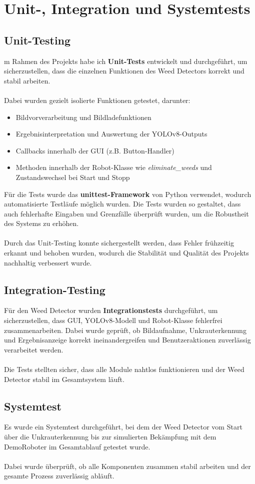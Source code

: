 \documentclass[12pt, a4paper]{scrreprt}
\begin{document}
\chapter{Unit-, Integration und Systemtests}
\section{Unit-Testing}
m Rahmen des Projekts habe ich \textbf{Unit-Tests} entwickelt und durchgeführt, um sicherzustellen, dass die einzelnen Funktionen des Weed Detectors korrekt und stabil arbeiten.\\
\\
Dabei wurden gezielt isolierte Funktionen getestet, darunter:
\begin{itemize}
    \item Bildvorverarbeitung und Bildladefunktionen
    \item Ergebnisinterpretation und Auswertung der YOLOv8-Outputs
    \item Callbacks innerhalb der GUI (z.B. Button-Handler)
    \item Methoden innerhalb der Robot-Klasse wie \emph{eliminate\_weeds} und Zustandswechsel bei Start und Stopp
\end{itemize}
Für die Tests wurde das \textbf{unittest-Framework} von Python verwendet, wodurch automatisierte Testläufe möglich wurden. Die Tests wurden so gestaltet, dass auch fehlerhafte Eingaben und Grenzfälle überprüft wurden, um die Robustheit des Systems zu erhöhen.\\
\\
Durch das Unit-Testing konnte sichergestellt werden, dass Fehler frühzeitig erkannt und behoben wurden, wodurch die Stabilität und Qualität des Projekts nachhaltig verbessert wurde.

\section{Integration-Testing}
Für den Weed Detector wurden \textbf{Integrationstests} durchgeführt, um sicherzustellen, dass GUI, YOLOv8-Modell und Robot-Klasse fehlerfrei zusammenarbeiten. Dabei wurde geprüft, ob Bildaufnahme, Unkrauterkennung und Ergebnisanzeige korrekt ineinandergreifen und Benutzeraktionen zuverlässig verarbeitet werden.\\
\\
Die Tests stellten sicher, dass alle Module nahtlos funktionieren und der Weed Detector stabil im Gesamtsystem läuft.

\section{Systemtest}
Es wurde ein Systemtest durchgeführt, bei dem der Weed Detector vom Start über die Unkrauterkennung bis zur simulierten Bekämpfung mit dem DemoRoboter im Gesamtablauf getestet wurde.\\
\\
Dabei wurde überprüft, ob alle Komponenten zusammen stabil arbeiten und der gesamte Prozess zuverlässig abläuft.
\end{document}
